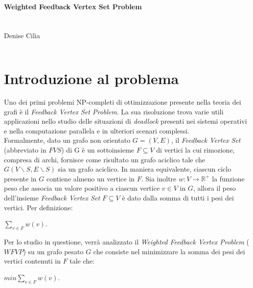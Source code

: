 \documentclass[a4paper, 10pt]{article}
\begin{document}
\begin{center}

\LARGE
\textbf{Weighted Feedback Vertex Set Problem}\\[6pt]

 \\
\\

{\fontsize{15pt}{0pt}\selectfont Denise Cilia}\\
{\fontsize{15pt}{0pt}}\\

\end{center}

\bigskip
\bigskip



\section{Introduzione al problema}\label{s:1}
Uno dei primi problemi NP-completi di ottimizzazione presente nella teoria dei grafi è il \textit{Feedback Vertex Set Problem}. La sua risoluzione trova varie utili applicazioni nello studio delle situazioni di \textit{deadlock} presenti nei sistemi operativi e nella computazione parallela e in ulteriori scenari complessi. \\
Formalmente, dato un grafo non orientato $G = (V, E)$, il \textit{Feedback Vertex Set} (abbreviato in $\mathit{FVS}$) di G è un sottoinsieme $F\subseteq V$ di vertici la cui rimozione, compresa di archi, fornisce come risultato un grafo aciclico tale che $G(V\backslash S, E \backslash S)$ sia un grafo aciclico. In maniera equivalente, ciascun ciclo presente in $G$ contiene almeno un vertice in $F$. Sia inoltre $w: V \to \mathbb{R}^+$ la funzione peso che associa un valore positivo a ciascun vertice $v \in V$ in $G$, allora il peso dell'insieme \textit{Feedback Vertex Set} $F\subseteq V$ è dato dalla somma di tutti i pesi dei vertici. Per definizione:

\begin{center}
$\sum_{v\in F} w(v)$.
\label{eq:fvs_minimum_weight}
\end{center}

\noindent
Per lo studio in questione, verrà analizzato il \textit{Weighted Feedback Vertex Problem} ($\mathit{WFVP}$) su un grafo pesato $G$ che consiste nel minimizzare la somma dei pesi dei vertici contenuti in $F$ tale che:

\begin{center}
$min \sum_{v \in F} w(v)$.
\end{center}
\end{document}
